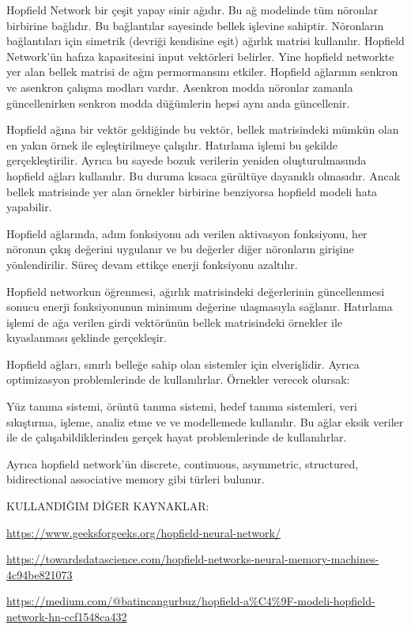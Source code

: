 \documentclass[11pt]{article}
\begin{document}
Hopfield Network bir çeşit yapay sinir ağıdır. Bu ağ modelinde tüm nöronlar birbirine bağlıdır. Bu bağlantılar sayesinde bellek işlevine sahiptir. Nöronların bağlantıları için simetrik (devriği kendisine eşit) ağırlık matrisi kullanılır. Hopfield Network'ün hafıza kapasitesini input vektörleri belirler. Yine hopfield networkte yer alan bellek matrisi de ağın permormansını etkiler.
Hopfield ağlarının  senkron ve asenkron çalışma modları vardır. Asenkron modda nöronlar zamanla güncellenirken senkron modda düğümlerin hepsi aynı anda güncellenir.

Hopfield  ağına bir vektör geldiğinde bu vektör, bellek matrisindeki mümkün olan en yakın örnek ile eşleştirilmeye çalışılır. Hatırlama işlemi bu şekilde gerçekleştirilir. Ayrıca bu sayede bozuk verilerin yeniden oluşturulmasında hopfield ağları kullanılır.  Bu duruma kısaca gürültüye dayanıklı olmasıdır. Ancak bellek matrisinde yer alan örnekler birbirine benziyorsa hopfield modeli hata yapabilir.

Hopfield ağlarında,  adım fonksiyonu adı verilen aktivasyon fonksiyonu, her nöronun çıkış değerini uygulanır ve bu değerler  diğer  nöronların girişine yönlendirilir.  Süreç devam ettikçe enerji fonksiyonu azaltılır. 

Hopfield  networkun öğrenmesi,  ağırlık matrisindeki değerlerinin güncellenmesi sonucu enerji fonksiyonunun minimum değerine ulaşmasıyla sağlanır.  Hatırlama işlemi de ağa verilen girdi vektörünün  bellek matrisindeki örnekler ile kıyaslanması şeklinde gerçekleşir.

Hopfield ağları,  sınırlı belleğe sahip olan sistemler için  elverişlidir. Ayrıca optimizasyon problemlerinde de kullanılırlar.  Örnekler verecek olursak:

Yüz tanıma sistemi, örüntü tanıma sistemi, hedef tanıma sistemleri, veri sıkıştırma, işleme, analiz etme ve ve modellemede kullanılır. Bu ağlar eksik veriler ile de çalışabildiklerinden gerçek hayat problemlerinde de kullanılırlar.

Ayrıca  hopfield network’ün discrete, continuous, asymmetric, structured, bidirectional associative memory gibi türleri bulunur.

KULLANDIĞIM DİĞER KAYNAKLAR:

\url{https://www.geeksforgeeks.org/hopfield-neural-network/}

\url{https://towardsdatascience.com/hopfield-networks-neural-memory-machines-4c94be821073}

\url{https://medium.com/@batincangurbuz/hopfield-a%C4%9F-modeli-hopfield-network-hn-ccf1548ca432}
\end{document}
